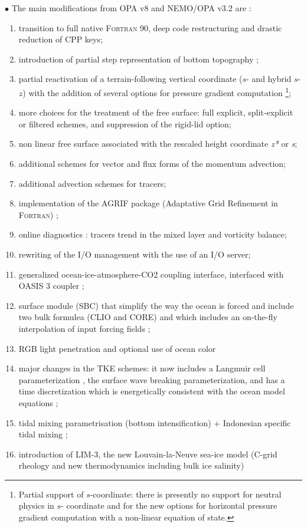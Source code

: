 $\bullet$ The main modifications from OPA v8 and NEMO/OPA v3.2 are :\\
\begin{enumerate}
\item transition to full native \textsc{Fortran} 90, deep code restructuring and drastic 
reduction of CPP keys; 
\item introduction of partial step representation of bottom topography \citep{Barnier_al_OD06, Le_Sommer_al_OM09, Penduff_al_OS07}; 
\item partial reactivation of a terrain-following vertical coordinate ($s$- and hybrid $s$-$z$) 
with the addition of several options for pressure gradient computation \footnote{Partial 
support of $s$-coordinate: there is presently no support for neutral physics in $s$-
coordinate and for the new options for horizontal pressure gradient computation with 
a non-linear equation of state.}; 
\item more choices for the treatment of the free surface: full explicit, split-explicit or filtered 
schemes, and suppression of the rigid-lid option;
\item non linear free surface associated with the rescaled height coordinate  
\textit{z*} or  \textit{s}; 
\item additional schemes for vector and flux forms of the momentum  advection; 
\item additional advection schemes for tracers; 
\item implementation of the AGRIF package (Adaptative Grid Refinement in \textsc{Fortran}) \citep{Debreu_al_CG2008}; 
\item online diagnostics : tracers trend in the mixed layer and vorticity balance;
\item rewriting of the I/O management with the use of an I/O server; 
\item generalized ocean-ice-atmosphere-CO2 coupling interface, interfaced with OASIS 3 coupler ;
\item surface module (SBC) that simplify the way the ocean is forced and include two
bulk formulea (CLIO and CORE) and which includes an on-the-fly interpolation of input forcing fields ;
\item RGB light penetration and optional use of ocean color 
\item major changes in the TKE schemes: it now includes a Langmuir cell parameterization  \citep{Axell_JGR02}, 
the \citet{Mellor_Blumberg_JPO04} surface wave breaking parameterization, and has a time discretization 
which is energetically consistent with the ocean model equations \citep{Burchard_OM02, Marsaleix_al_OM08}; 
\item tidal mixing parametrisation (bottom intensification) + Indonesian specific tidal mixing \citep{Koch-Larrouy_al_GRL07}; 
\item introduction of LIM-3, the new Louvain-la-Neuve sea-ice model (C-grid rheology and
new thermodynamics including bulk ice salinity) \citep{Vancoppenolle_al_OM09a, Vancoppenolle_al_OM09b}
\end{enumerate}

